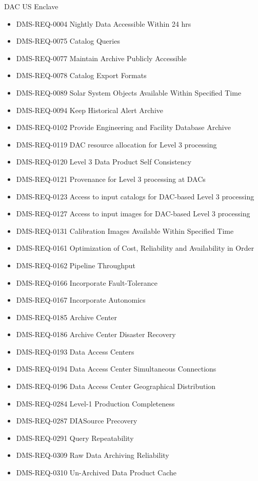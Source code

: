 DAC US Enclave \begin{itemize}
\item DMS-REQ-0004 Nightly Data Accessible Within 24 hrs
\item DMS-REQ-0075 Catalog Queries
\item DMS-REQ-0077 Maintain Archive Publicly Accessible
\item DMS-REQ-0078 Catalog Export Formats
\item DMS-REQ-0089 Solar System Objects Available Within Specified Time
\item DMS-REQ-0094 Keep Historical Alert Archive
\item DMS-REQ-0102 Provide Engineering and Facility Database Archive
\item DMS-REQ-0119 DAC resource allocation for Level 3 processing
\item DMS-REQ-0120 Level 3 Data Product Self Consistency
\item DMS-REQ-0121 Provenance for Level 3 processing at DACs
\item DMS-REQ-0123 Access to input catalogs for DAC-based Level 3 processing
\item DMS-REQ-0127 Access to input images for DAC-based Level 3 processing
\item DMS-REQ-0131 Calibration Images Available Within Specified Time
\item DMS-REQ-0161 Optimization of Cost, Reliability and Availability in Order
\item DMS-REQ-0162 Pipeline Throughput
\item DMS-REQ-0166 Incorporate Fault-Tolerance
\item DMS-REQ-0167 Incorporate Autonomics
\item DMS-REQ-0185 Archive Center
\item DMS-REQ-0186 Archive Center Disaster Recovery
\item DMS-REQ-0193 Data Access Centers
\item DMS-REQ-0194 Data Access Center Simultaneous Connections
\item DMS-REQ-0196 Data Access Center Geographical Distribution
\item DMS-REQ-0284 Level-1 Production Completeness
\item DMS-REQ-0287 DIASource Precovery
\item DMS-REQ-0291 Query Repeatability
\item DMS-REQ-0309 Raw Data Archiving Reliability
\item DMS-REQ-0310 Un-Archived Data Product Cache

\end{itemize}

